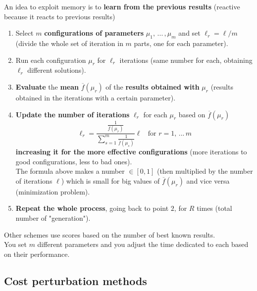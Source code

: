 \documentclass[11pt]{article}
\begin{document}
	An idea to exploit memory is to \textbf{learn from the previous results} (reactive because it reacts to previous results)
	\begin{enumerate}
		\item Select $m$ \textbf{configurations of parameters} $\mu_1,\, ... \, , \mu_m$ and set $\ell_r = \ell/m$ (divide the whole set of iteration in $m$ parts, one for each parameter).\\
		
		\item Run each configuration $\mu_r$ for $\ell_r$ iterations (same number for each, obtaining $\ell_r$ different solutions).\\
		
		\item \textbf{Evaluate} the \textbf{mean} $\overline{f} (\mu_r)$ of the \textbf{results obtained with} $\mu_r$ (results obtained in the iterations with a certain parameter).\\
		
		\item \textbf{Update the number of iterations} $\ell_r$ for each $\mu_r$ based on $\overline{f} (\mu_r)$
		$$ \ell_r = \frac{ \frac{ 1}{ \overline{f} (\mu_r) } } { \sum_{s=1}^m \frac{ 1 }{ \overline{f} (\mu_s) }} \ell \;\; \text{ for } r = 1, \, ... \, m $$
		\textbf{increasing it for the more effective configurations} (more iterations to good configurations, less to bad ones).\\
		The formula above makes a number $\in [0,1]$ (then multiplied by the number of iterations $\ell$) which is small for big values of $\overline{f} (\mu_r)$ and vice versa (minimization problem).\\
		
		\item \textbf{Repeat the whole process}, going back to point $2$, for $R$ times (total number of "generation").\\
		
	\end{enumerate}
	Other schemes use scores based on the number of best known results.\\
	
	You set $m$ different parameters and you adjust the time dedicated to each based on their performance.\\
	
	\newpage
	
	\subsection{Cost perturbation methods}
	
\end{document}
